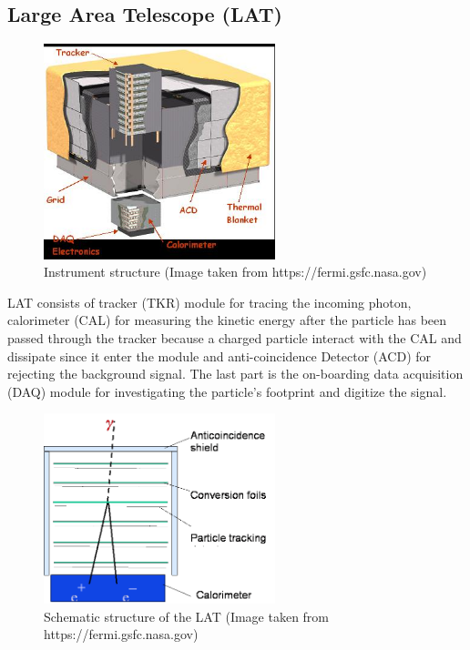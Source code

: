 \subsection{Large Area Telescope (LAT)}


\begin{figure}[h!]
    \centering
    \includegraphics[width=0.6\textwidth]{content/background/figures/LATStructure.jpg}
    \caption{Instrument structure (Image taken from https://fermi.gsfc.nasa.gov)}
    \label{fig:fermi_lat_structure}
\end{figure}

LAT consists of tracker (TKR) module for tracing the incoming photon,
calorimeter (CAL) for measuring the kinetic energy after the particle 
has been passed through the tracker because a charged particle 
interact with the CAL and dissipate since it enter the module
and anti-coincidence Detector (ACD) for rejecting the background 
signal. The last part is the on-boarding data acquisition (DAQ)
module for investigating the particle's footprint and digitize
the signal.


\begin{figure}[h!]
    \centering
    \includegraphics[width=0.6\textwidth]{content/background/figures/LAT_layers.png}
    \caption{Schematic structure of the LAT (Image taken from https://fermi.gsfc.nasa.gov)}
    \label{fig:fermi_lat_layers}
\end{figure}




